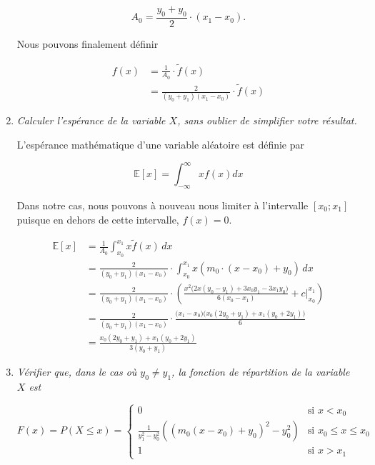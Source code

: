\documentclass[a4paper,11pt]{report}
\begin{document}
\begin{enumerate}[\indent a)]
\begin{equation*}
	A_0 = \frac{y_0 + y_0}{2} \cdot (x_1 - x_0).
\end{equation*}

Nous pouvons finalement définir

\begin{align*}
	f(x) &= \frac{1}{A_0} \cdot  \tilde{f}(x) \\
	     &= \frac{2}{(y_0 + y_1)(x_1 - x_0)} \cdot \tilde{f}(x)
\end{align*}

\item {\em Calculer l'espérance de la variable $X$, sans oublier de simplifier votre résultat.}

L'espérance mathématique d'une variable aléatoire est définie par

\begin{equation*}
	\mathbb{E}[x] = \int_{-\infty}^{\infty} x f(x) dx
\end{equation*}

Dans notre cas, nous pouvons à nouveau nous limiter à l'intervalle $[x_{0}; x_{1}]$ puisque en dehors de cette intervalle, $f(x)=0$.

\begingroup
\addtolength{\jot}{1em}
\begin{align*}
\mathbb{E}[x] &= \frac{1}{A_0} \int_{x_0}^{x_1} x \tilde{f}(x) \,dx \\
           &= \frac{2}{(y_0 + y_1)(x_1 - x_0)} \cdot \int_{x_0}^{x_1} x (m_0 \cdot (x - x_0) + y_0) \,dx \\
           &= \frac{2}{(y_0 + y_1)(x_1 - x_0)} \cdot \left( \frac{x^2 \big(2x (y_0-y_1) + 3 x_0 y_1 - 3 x_1 y_0\big)}{6 (x_0-x_1)}+c \biggr\rvert^{x_1}_{x_0} \right) \\
           &= \frac{2}{(y_0 + y_1)(x_1 - x_0)} \cdot \frac{\big(x_1-x_0\big) \big(x_0 (2 y_0+y_1)+x_1 (y_0+2 y_1)\big)}{6} \\
           &= \frac{x_0 (2y_0 + y_1) + x_1 (y_0 + 2y_1)}{3 (y_0+y_1)}
\end{align*}
\endgroup

\item {\em Vérifier que, dans le cas où $y_{0} \neq y_{1}$, la fonction de répartition de la variable $X$ est}

\begin{equation*}
	F(x) = P(X \leq x) = \left\lbrace \begin{array}{ll}
		0						& \text{si $x < x_0$} \\
		\frac{1}{y^2_1 - y^2_0} \left( \left( m_0 \left( x - x_0 \right) + y_0 \right)^2 - y^2_0 \right)	& \text{si $x_0 \leq x \leq x_0$} \\
		1 						& \text{si $x > x_1$}
	\end{array} \right.
\end{equation*}


\end{enumerate}
\end{document}
